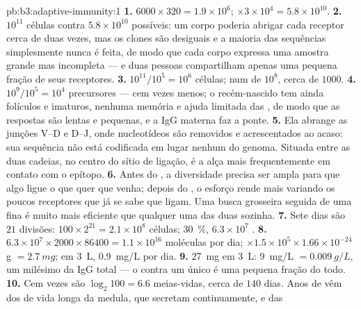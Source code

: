 \begin{solution}{pb:b3:adaptive-immunity:1}
\textbf{1.} $6000\times 320 = 1.9\times 10^{6}$; $\times 3\times 10^{4}
= 5.8\times 10^{10}$.
\textbf{2.} $10^{11}$ células contra $5.8\times 10^{10}$ possíveis: um
corpo poderia abrigar cada receptor cerca de duas vezes, mas os clones
são desiguais e a maioria das sequências simplesmente nunca é feita, de
modo que cada corpo expressa uma amostra grande mas incompleta --- e
duas pessoas compartilham apenas uma pequena fração de seus receptores.
\textbf{3.} $10^{11}/10^{5} = 10^{6}$ células; num  de
$10^{8}$, cerca de $1000$.
\textbf{4.} $10^{9}/10^{5} = 10^{4}$ precursores --- cem vezes menos; o
recém-nascido tem ainda folículos e  imaturos,
nenhuma memória e ajuda limitada das , de modo que as respostas
são lentas e pequenas, e a IgG materna faz a ponte.
\textbf{5.} Ela abrange as junções V--D e D--J, onde nucleotídeos são
removidos e acrescentados ao acaso: sua sequência não está codificada
em lugar nenhum do genoma. Situada entre as duas cadeias, no centro do
sítio de ligação, é a alça mais frequentemente em contato com o epítopo.
\textbf{6.} Antes do , a diversidade precisa ser ampla para que
algo ligue o que quer que venha; depois do , o esforço rende
mais variando os poucos receptores que já se sabe que ligam. Uma busca
grosseira seguida de uma fina é muito mais eficiente que qualquer uma
das duas sozinha.
\textbf{7.} Sete dias são $21$ divisões: $100\times 2^{21} = 2.1\times
10^{8}$ células; \qty{30}{\%}, $6.3\times 10^{7}$ .
\textbf{8.} $6.3\times 10^{7}\times 2000\times \num{86400} = 1.1\times
10^{16}$ moléculas por dia; $\times 1.5\times 10^{5}\times 1.66\times
10^{-24}$ g $= \qty{2.7}{mg}$; em \qty{3}{L}, \qty{0.9}{mg/L} por dia.
\textbf{9.} \qty{27}{mg} em \qty{3}{L}: \qty{9}{mg/L} $= \qty{0.009}{g/L}$,
um milésimo da IgG total --- o  contra um único  é uma
pequena fração do todo.
\textbf{10.} Cem vezes são $\log_{2}100 = 6.6$ meias-vidas, cerca de
$140$ dias. Anos de  vêm dos  de vida longa da
medula, que secretam continuamente, e das 

\end{solution}
